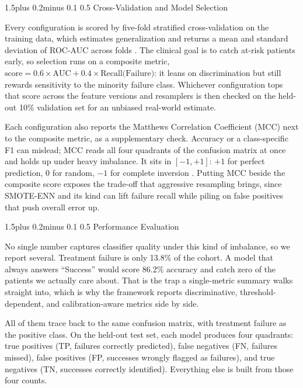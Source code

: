 \documentclass[12pt]{article}
\makeatletter
\renewcommand{\_}{\textunderscore\allowbreak}
\renewcommand{\subsubsection}{\@startsection{subsubsection}{3}{0pt}%
  {1.5\baselineskip plus 0.2\baselineskip minus 0.1\baselineskip}%
  {0.5\baselineskip}%
  {\bfseries\itshape\normalsize}}
\makeatother
\begin{document}
\subsubsection{Cross-Validation and Model Selection}

Every configuration is scored by five-fold stratified cross-validation on the training data, which estimates generalization and returns a mean and standard deviation of ROC-AUC across folds \citep{hastie2009elements}. The clinical goal is to catch at-risk patients early, so selection runs on a composite metric, $\text{score} = 0.6 \times \text{AUC} + 0.4 \times \text{Recall(Failure)}$: it leans on discrimination but still rewards sensitivity to the minority failure class. Whichever configuration tops that score across the feature versions and resamplers is then checked on the held-out 10\% validation set for an unbiased real-world estimate.

Each configuration also reports the Matthews Correlation Coefficient (MCC) next to the composite metric, as a supplementary check. Accuracy or a class-specific F1 can mislead; MCC reads all four quadrants of the confusion matrix at once and holds up under heavy imbalance. It sits in $[-1, +1]$: $+1$ for perfect prediction, $0$ for random, $-1$ for complete inversion \citep{chicco2020advantages}. Putting MCC beside the composite score exposes the trade-off that aggressive resampling brings, since SMOTE-ENN and its kind can lift failure recall while piling on false positives that push overall error up.

\subsubsection{Performance Evaluation}

No single number captures classifier quality under this kind of imbalance, so we report several. Treatment failure is only 13.8\% of the cohort. A model that always answers ``Success'' would score 86.2\% accuracy and catch zero of the patients we actually care about. That is the trap a single-metric summary walks straight into, which is why the framework reports discriminative, threshold-dependent, and calibration-aware metrics side by side.

All of them trace back to the same confusion matrix, with treatment failure as the positive class. On the held-out test set, each model produces four quadrants: true positives (TP, failures correctly predicted), false negatives (FN, failures missed), false positives (FP, successes wrongly flagged as failures), and true negatives (TN, successes correctly identified). Everything else is built from those four counts.
\end{document}
